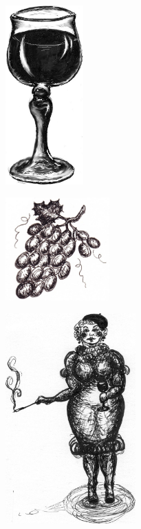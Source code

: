 \sclearpage

\begin{figure}[!b]
\begin{center}
\includegraphics[width=3cm]{../bilder/vinglas.jpg} 
\end{center}
\end{figure}
\sclearpage

\sclearpage

\sclearpage


\sclearpage

\begin{figure}[!b]
\begin{center}
\includegraphics[width=4cm]{../bilder/druvor.jpg} 
\end{center}
\end{figure}
\sclearpage

\begin{figure}[!b]
\begin{center}
\includegraphics[width=50mm]{../bilder/fetfransyska.jpg} 
\end{center}
\end{figure}
\sclearpage


\sclearpage

